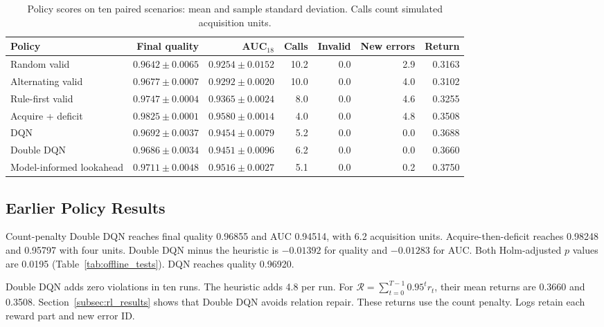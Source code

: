 \begin{table}[t]
\centering
\caption{Policy scores on ten paired scenarios: mean and sample standard deviation. Calls count simulated acquisition units.}
\label{tab:rl_ablation}
\footnotesize
\setlength{\tabcolsep}{3pt}
\begin{tabular*}{\textwidth}{@{\extracolsep{\fill}}lrrrrrr@{}}
\toprule
Policy & Final quality & AUC$_{18}$ & Calls & Invalid & New errors & Return \\
\midrule
Random valid & $0.9642\pm0.0065$ & $0.9254\pm0.0152$ & 10.2 & 0.0 & 2.9 & 0.3163 \\
Alternating valid & $0.9677\pm0.0007$ & $0.9292\pm0.0020$ & 10.0 & 0.0 & 4.0 & 0.3102 \\
Rule-first valid & $0.9747\pm0.0004$ & $0.9365\pm0.0024$ & 8.0 & 0.0 & 4.6 & 0.3255 \\
Acquire + deficit & $0.9825\pm0.0001$ & $0.9580\pm0.0014$ & 4.0 & 0.0 & 4.8 & 0.3508 \\
DQN & $0.9692\pm0.0037$ & $0.9454\pm0.0079$ & 5.2 & 0.0 & 0.0 & 0.3688 \\
Double DQN & $0.9686\pm0.0034$ & $0.9451\pm0.0096$ & 6.2 & 0.0 & 0.0 & 0.3660 \\
Model-informed lookahead & $0.9711\pm0.0048$ & $0.9516\pm0.0027$ & 5.1 & 0.0 & 0.2 & 0.3750 \\
\bottomrule
\end{tabular*}
\end{table}


\subsection{Earlier Policy Results}

Count-penalty Double DQN reaches final quality 0.96855 and AUC 0.94514,
with 6.2 acquisition units. Acquire-then-deficit reaches 0.98248 and
0.95797 with four units. Double DQN minus the heuristic is $-0.01392$
for quality and $-0.01283$ for AUC. Both Holm-adjusted $p$ values are
0.0195 (Table~\ref{tab:offline_tests}). DQN reaches quality 0.96920.

Double DQN adds zero violations in ten runs. The heuristic adds 4.8
per run. For $\mathcal R=\sum_{t=0}^{T-1}0.95^t r_t$, their mean
returns are 0.3660 and 0.3508. Section~\ref{subsec:rl_results} shows
that Double DQN avoids relation repair. These returns use the count
penalty. Logs retain each reward part and new error ID.

